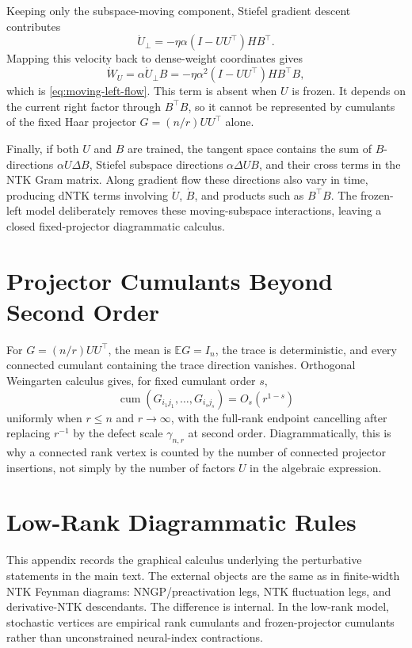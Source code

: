 \documentclass{article}
\newcommand{\E}{\mathbb E}
\newcommand{\cumul}{\operatorname{cum}}
\begin{document}
Keeping only the subspace-moving component, Stiefel gradient descent contributes
\[
\dot U_{\perp}
=-\eta\alpha(I-UU^\top)HB^\top.
\]
Mapping this velocity back to dense-weight coordinates gives
\[
\dot W_U
=\alpha \dot U_{\perp}B
=-\eta\alpha^2(I-UU^\top)H B^\top B,
\]
which is \eqref{eq:moving-left-flow}. This term is absent when \(U\) is frozen. It depends on the current right factor through \(B^\top B\), so it cannot be represented by cumulants of the fixed Haar projector \(G=(n/r)UU^\top\) alone.

Finally, if both \(U\) and \(B\) are trained, the tangent space contains the sum of \(B\)-directions \(\alpha U\Delta B\), Stiefel subspace directions \(\alpha\Delta U B\), and their cross terms in the NTK Gram matrix. Along gradient flow these directions also vary in time, producing dNTK terms involving \(\dot U\), \(\dot B\), and products such as \(B^\top B\). The frozen-left model deliberately removes these moving-subspace interactions, leaving a closed fixed-projector diagrammatic calculus.

\section{Projector Cumulants Beyond Second Order}
For \(G=(n/r)UU^\top\), the mean is \(\E G=I_n\), the trace is deterministic, and every connected cumulant containing the trace direction vanishes. Orthogonal Weingarten calculus gives, for fixed cumulant order \(s\),
\begin{equation}
\cumul(G_{i_1j_1},\ldots,G_{i_sj_s})
=O_s(r^{1-s})
\end{equation}
uniformly when \(r\le n\) and \(r\to\infty\), with the full-rank endpoint cancelling after replacing \(r^{-1}\) by the defect scale \(\gamma_{n,r}\) at second order. Diagrammatically, this is why a connected rank vertex is counted by the number of connected projector insertions, not simply by the number of factors \(U\) in the algebraic expression.

\section{Low-Rank Diagrammatic Rules}
\label{app:diagrammatic-rules}
This appendix records the graphical calculus underlying the perturbative statements in the main text. The external objects are the same as in finite-width NTK Feynman diagrams: NNGP/preactivation legs, NTK fluctuation legs, and derivative-NTK descendants. The difference is internal. In the low-rank model, stochastic vertices are empirical rank cumulants and frozen-projector cumulants rather than unconstrained neural-index contractions.
\end{document}
